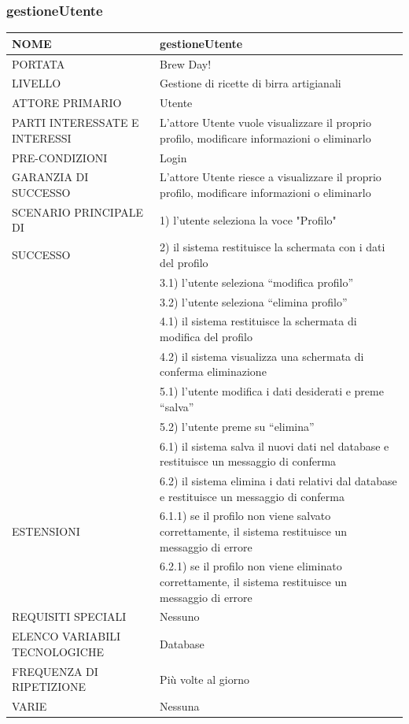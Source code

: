 \documentclass[a4paper, titlepage]{article}
\begin{document}
\subsubsection{gestioneUtente}
\begin{longtable}{p{6cm}p{7cm}}\toprule
    NOME & gestioneUtente\\\midrule
    PORTATA & Brew Day!\\\midrule
    LIVELLO & Gestione di ricette di birra artigianali\\\midrule
    ATTORE PRIMARIO & Utente\\\midrule
    PARTI INTERESSATE E INTERESSI & L’attore Utente vuole visualizzare il proprio profilo, modificare informazioni o eliminarlo\\\midrule
    PRE-CONDIZIONI & Login\\\midrule
    GARANZIA DI SUCCESSO & L’attore Utente riesce a visualizzare il proprio profilo, modificare informazioni o eliminarlo\\\midrule
    SCENARIO PRINCIPALE DI
    & 1) l’utente seleziona la voce "Profilo"\\
    SUCCESSO & 2) il sistema restituisce la schermata con i dati del profilo\\
    & 3.1) l’utente seleziona “modifica profilo”\\
    & 3.2) l’utente seleziona “elimina profilo”\\
    & 4.1) il sistema restituisce la schermata di modifica del profilo\\
    & 4.2) il sistema visualizza una schermata di conferma eliminazione\\
    & 5.1) l’utente modifica i dati desiderati e preme “salva”\\
    & 5.2) l’utente preme su “elimina”\\
    & 6.1) il sistema salva il nuovi dati nel database e restituisce un messaggio di conferma\\
    & 6.2) il sistema elimina i dati relativi dal database e restituisce un messaggio di conferma\\\midrule
    ESTENSIONI
    & 6.1.1) se il profilo non viene salvato correttamente, il sistema restituisce un messaggio di errore\\
    & 6.2.1) se il profilo non viene eliminato correttamente, il sistema restituisce un messaggio di errore\\\midrule
    REQUISITI SPECIALI & Nessuno\\\midrule
    ELENCO VARIABILI TECNOLOGICHE & Database\\\midrule
    FREQUENZA DI RIPETIZIONE & Più volte al giorno\\\midrule
    VARIE & Nessuna\\\bottomrule
\end{longtable}
\newpage
\end{document}
